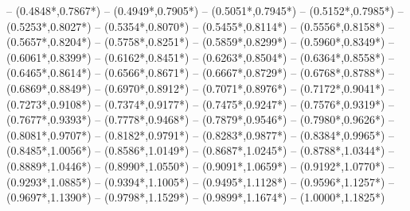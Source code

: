{	-- ({0.4848*\dx},{0.7867*\dy}) %
	-- ({0.4949*\dx},{0.7905*\dy}) %
	-- ({0.5051*\dx},{0.7945*\dy}) %
	-- ({0.5152*\dx},{0.7985*\dy}) %
	-- ({0.5253*\dx},{0.8027*\dy}) %
	-- ({0.5354*\dx},{0.8070*\dy}) %
	-- ({0.5455*\dx},{0.8114*\dy}) %
	-- ({0.5556*\dx},{0.8158*\dy}) %
	-- ({0.5657*\dx},{0.8204*\dy}) %
	-- ({0.5758*\dx},{0.8251*\dy}) %
	-- ({0.5859*\dx},{0.8299*\dy}) %
	-- ({0.5960*\dx},{0.8349*\dy}) %
	-- ({0.6061*\dx},{0.8399*\dy}) %
	-- ({0.6162*\dx},{0.8451*\dy}) %
	-- ({0.6263*\dx},{0.8504*\dy}) %
	-- ({0.6364*\dx},{0.8558*\dy}) %
	-- ({0.6465*\dx},{0.8614*\dy}) %
	-- ({0.6566*\dx},{0.8671*\dy}) %
	-- ({0.6667*\dx},{0.8729*\dy}) %
	-- ({0.6768*\dx},{0.8788*\dy}) %
	-- ({0.6869*\dx},{0.8849*\dy}) %
	-- ({0.6970*\dx},{0.8912*\dy}) %
	-- ({0.7071*\dx},{0.8976*\dy}) %
	-- ({0.7172*\dx},{0.9041*\dy}) %
	-- ({0.7273*\dx},{0.9108*\dy}) %
	-- ({0.7374*\dx},{0.9177*\dy}) %
	-- ({0.7475*\dx},{0.9247*\dy}) %
	-- ({0.7576*\dx},{0.9319*\dy}) %
	-- ({0.7677*\dx},{0.9393*\dy}) %
	-- ({0.7778*\dx},{0.9468*\dy}) %
	-- ({0.7879*\dx},{0.9546*\dy}) %
	-- ({0.7980*\dx},{0.9626*\dy}) %
	-- ({0.8081*\dx},{0.9707*\dy}) %
	-- ({0.8182*\dx},{0.9791*\dy}) %
	-- ({0.8283*\dx},{0.9877*\dy}) %
	-- ({0.8384*\dx},{0.9965*\dy}) %
	-- ({0.8485*\dx},{1.0056*\dy}) %
	-- ({0.8586*\dx},{1.0149*\dy}) %
	-- ({0.8687*\dx},{1.0245*\dy}) %
	-- ({0.8788*\dx},{1.0344*\dy}) %
	-- ({0.8889*\dx},{1.0446*\dy}) %
	-- ({0.8990*\dx},{1.0550*\dy}) %
	-- ({0.9091*\dx},{1.0659*\dy}) %
	-- ({0.9192*\dx},{1.0770*\dy}) %
	-- ({0.9293*\dx},{1.0885*\dy}) %
	-- ({0.9394*\dx},{1.1005*\dy}) %
	-- ({0.9495*\dx},{1.1128*\dy}) %
	-- ({0.9596*\dx},{1.1257*\dy}) %
	-- ({0.9697*\dx},{1.1390*\dy}) %
	-- ({0.9798*\dx},{1.1529*\dy}) %
	-- ({0.9899*\dx},{1.1674*\dy}) %
	-- ({1.0000*\dx},{1.1825*\dy}) %
}
